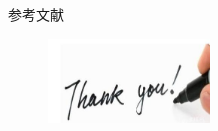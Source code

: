 \documentclass{beamer}
\begin{document}





 \begin{frame}{参考文献}
  \tiny
  
\end{frame}

\begin{frame}
  \begin{figure}
    \includegraphics[height=2.23cm,width=4.29cm]{images/thank.jpg}
  \end{figure} 
\end{frame}
\end{document}
